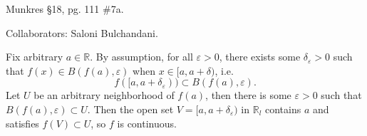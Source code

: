 \documentclass[10pt]{report}
\begin{document}
\begin{exer}[4 points]
Munkres \S 18, pg. 111 \#7a.
\end{exer}
{\color{blue}Collaborators: Saloni Bulchandani.}

Fix arbitrary $a \in \mathbb{R}$. By assumption, for all $\varepsilon>0$, there exists some $\delta_{\varepsilon}>0$ such that $f(x) \in B(f(a),\varepsilon)$ when $x \in [a,a+\delta)$, i.e.
\[
	f([a,a+\delta_{\varepsilon})) \subset B(f(a), \varepsilon).
\]
Let $U$ be an arbitrary neighborhood of $f(a)$, then there is some $\varepsilon>0$ such that $B(f(a),\varepsilon) \subset U$. Then the open set $V=[a, a+\delta_\varepsilon)$ in $\mathbb{R}_l$ contains $a$ and satisfies $f(V) \subset U$, so $f$ is continuous.
\end{document}
